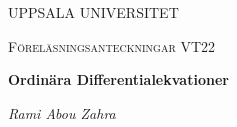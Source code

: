 \begin{titlepage}

  \centering
	{\scshape\LARGE UPPSALA UNIVERSITET\par}
	\vspace{1cm}
  {\scshape\Large {Föreläsningsanteckningar VT22} \par}
	\vspace{1.5cm}
  {\huge\bfseries {Ordinära Differentialekvationer} \par}
	\vspace{2cm}
	{\Large\itshape Rami Abou Zahra \par}
	\vfill
  \vfill


\end{titlepage}
